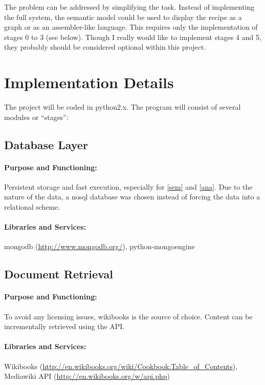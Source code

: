 \documentclass[a4paper,10pt]{scrartcl}
\begin{document}
The problem can be addressed by simplifying the task. Instead of implementing the full system,
the semantic model could be used to display the recipe as a graph or as an assembler-like language.
This requires only the implementation of stages 0 to 3 (see below). Though I really would like to
implement stages 4 and 5, they probably should be considered optional within this project.

\section{Implementation Details}
\setcounter{subsection}{-1}
The project will be coded in python2.x. The program will consist of several modules or ``stages'':

\newcommand{\paf}{\paragraph{Purpose and Functioning:}}
\newcommand{\lib}{\paragraph{Libraries and Services:}}
\newcommand{\tm}{\paragraph{Time Management and Optional Functionality:}}
\renewcommand{\thesubsection}{Stage \arabic{subsection}:}

\subsection{Database Layer}
\paf Persistent storage and fast execution, especially for \ref{sem} and \ref{ana}. Due to the nature
of the data, a nosql database was chosen instead of forcing the data into a relational scheme.
\lib mongodb (\url{http://www.mongodb.org/}), python-mongoengine

\subsection{Document Retrieval}
\paf To avoid any licensing issues, wikibooks is the source of choice. Content can be incrementally retrieved using the API.
\lib Wikibooks (\url{http://en.wikibooks.org/wiki/Cookbook:Table_of_Contents}),
Mediawiki API (\url{http://en.wikibooks.org/w/api.php})
\end{document}
